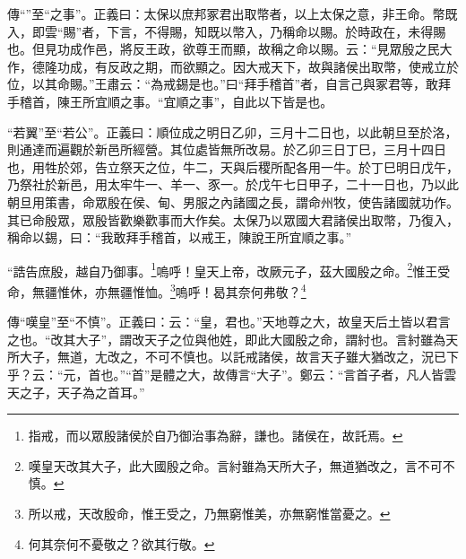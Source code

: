 {\noindent\zhuan{}\fzbyks 傳“”至“之事”。正義曰：太保以庶邦冢君出取幣者，以上太保之意，非王命。幣既入，即雲“賜”者，下言，不得賜，知既以幣入，乃稱命以賜。於時政在，未得賜也。但見功成作邑，將反王政，欲尊王而顯，故稱之命以賜。云：“見眾殷之民大作，德隆功成，有反政之期，而欲顯之。因大戒天下，故與諸侯出取幣，使戒立於位，以其命賜。”王肅云：“為戒錫是也。”曰“拜手稽首”者，自言己與冢君等，敢拜手稽首，陳王所宜順之事。“宜順之事”，自此以下皆是也。 \par}

{\noindent\shu{}\fzkt “若翼”至“若公”。正義曰：順位成之明日乙卯，三月十二日也，以此朝旦至於洛，則通達而遍觀於新邑所經營。其位處皆無所改易。於乙卯三日丁巳，三月十四日也，用牲於郊，告立祭天之位，牛二，天與后稷所配各用一牛。於丁巳明日戊午，乃祭社於新邑，用太牢牛一、羊一、豕一。於戊午七日甲子，二十一日也，乃以此朝旦用策書，命眾殷在侯、甸、男服之內諸國之長，謂命州牧，使告諸國就功作。其已命殷眾，眾殷皆歡樂歡事而大作矣。太保乃以眾國大君諸侯出取幣，乃復入，稱命以錫，曰：“我敢拜手稽首，以戒王，陳說王所宜順之事。” \par}

“誥告庶殷，越自乃御事。\footnote{指戒，而以眾殷諸侯於自乃御治事為辭，謙也。諸侯在，故託焉。}嗚呼！皇天上帝，改厥元子，茲大國殷之命。\footnote{嘆皇天改其大子，此大國殷之命。言紂雖為天所大子，無道猶改之，言不可不慎。}惟王受命，無疆惟休，亦無疆惟恤。\footnote{所以戒，天改殷命，惟王受之，乃無窮惟美，亦無窮惟當憂之。}嗚呼！曷其奈何弗敬？\footnote{何其奈何不憂敬之？欲其行敬。}


{\noindent\zhuan{}\fzbyks 傳“嘆皇”至“不慎”。正義曰：云：“皇，君也。”天地尊之大，故皇天后土皆以君言之也。“改其大子”，謂改天子之位與他姓，即此大國殷之命，謂紂也。言紂雖為天所大子，無道，尢改之，不可不慎也。以託戒諸侯，故言天子雖大猶改之，況已下乎？云：“元，首也。”“首”是體之大，故傳言“大子”。鄭云：“言首子者，凡人皆雲天之子，天子為之首耳。” \par}

